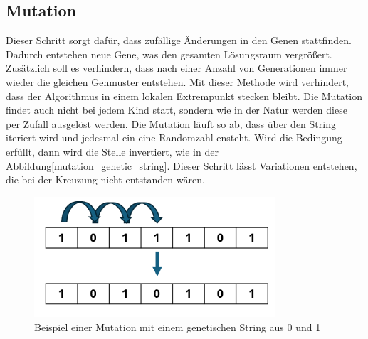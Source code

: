 %
%
%
%
\subsection{Mutation
\label{buch:paper:varalg:subsection:mutation}}
Dieser Schritt sorgt dafür, dass zufällige Änderungen in 
den Genen stattfinden. Dadurch entstehen neue Gene, was den 
gesamten Lösungsraum vergrößert. Zusätzlich soll es verhindern,
dass nach einer Anzahl von Generationen immer wieder die
gleichen Genmuster entstehen. Mit dieser Methode wird
verhindert, dass der Algorithmus in einem lokalen Extrempunkt
stecken bleibt. Die Mutation findet auch nicht bei jedem Kind
statt, sondern wie in der Natur werden diese per Zufall
ausgelöst werden. Die Mutation läuft so ab, dass über den String
iteriert wird und jedesmal ein eine Randomzahl ensteht. Wird 
die Bedingung erfüllt, dann wird die Stelle invertiert, wie in der
Abbildung\ref{mutation_genetic_string}. Dieser Schritt lässt Variationen 
entstehen, die bei der Kreuzung nicht entstanden wären.  
\begin{figure}
	\centering
	\includegraphics[width=0.8\textwidth]{
        papers/varalg/images/teil3/09GeneticStringMutation.png
        }
	\caption{Beispiel einer Mutation mit einem genetischen String aus 0 und 1}
	\label{fig:mutation_genetic_string}
\end{figure}

